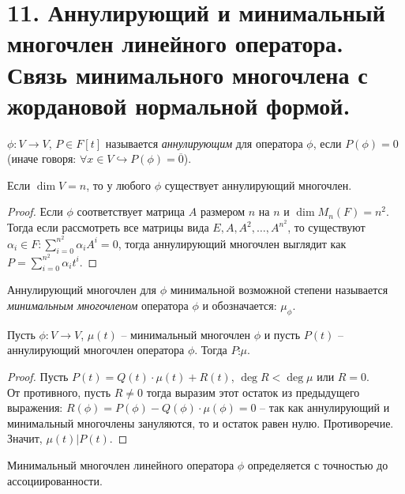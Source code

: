 \section{11. Аннулирующий и минимальный многочлен линейного оператора. Связь минимального многочлена с жордановой нормальной формой.}

\begin{definition}
    $\phi: V \to V$, $P \in F[t]$ называется \textit{аннулирующим} для оператора $\phi$, если $P(\phi) = 0$ (иначе говоря: $\forall x \in V \hookrightarrow P(\phi) = \overline{0}$).
\end{definition}

\begin{note}
    Если $\dim V = n$, то у любого $\phi$ существует аннулирующий многочлен.
\end{note}

\begin{proof}
    Если $\phi$ соответствует матрица $A$ размером $n$ на $n$ и $\dim M_n(F) = n^2$. \\
    Тогда если рассмотреть все матрицы вида $E, A, A^2, \dots, A^{n^2}$, то существуют $\alpha_i \in F: \sum_{i = 0}^{n^2} \alpha_i A^i = 0$, тогда аннулирующий многочлен выглядит как $P = \sum_{i = 0}^{n^2} \alpha_i t^i$.
\end{proof}

\begin{definition}
    Аннулирующий многочлен для $\phi$ минимальной возможной степени называется \textit{минимальным многочленом} оператора $\phi$ и обозначается: $\mu_{\phi}$.
\end{definition}

\begin{theorem}
    \label{th4.5}
    Пусть $\phi: V \to V$, $\mu(t)$ -- минимальный многочлен $\phi$ и пусть $P(t)$ -- аннулирующий многочлен оператора $\phi$. Тогда $P \vdots \mu$.
\end{theorem}

\begin{proof}
    Пусть $P(t) = Q(t) \cdot \mu(t) + R(t)$, $\deg R < \deg \mu$ или $R = 0$. \\
    От противного, пусть $R \neq 0$ тогда выразим этот остаток из предыдущего выражения: 
    $R(\phi) = P(\phi) - Q(\phi) \cdot \mu (\phi) = 0$ -- так как аннулирующий и минимальный 
    многочлены зануляются, то и остаток равен нулю. Противоречие. Значит, $\mu(t) \vert P(t)$.
\end{proof}

\begin{corollary}
    Минимальный многочлен линейного оператора $\phi$ определяется с точностью до ассоциированности.
\end{corollary}

